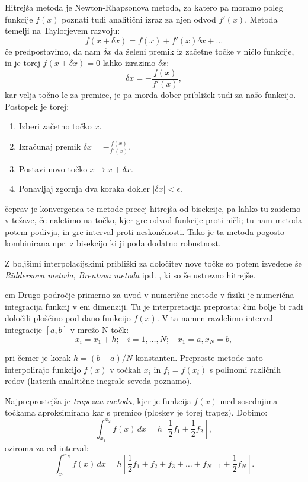 \documentclass[12pt]{article}
\begin{document}
Hitrejša metoda je Newton-Rhapsonova metoda, za katero pa moramo
poleg funkcije $f(x)$ poznati tudi analitični izraz za njen odvod
$f'(x)$.
Metoda temelji na Taylorjevem razvoju:
$$f(x+\delta x) = f(x)+f'(x) \delta x + \ldots$$
če predpostavimo, da nam $\delta x$ da želeni premik iz začetne
 točke v ničlo funkcije, in je torej $f(x+\delta x) = 0$
lahko izrazimo $\delta x$:
$$ \delta x = - \frac{f(x)}{f'(x)},$$
kar velja točno le za premice, je pa morda dober približek tudi
za našo funkcijo. Postopek je torej:
\begin{enumerate}
\item Izberi začetno točko $x$.
\item Izračunaj  premik $ \delta x = - \frac{f(x)}{f'(x)}.$
\item Postavi novo točko $x \to x+\delta x$.
\item Ponavljaj zgornja dva koraka dokler $|\delta x |< \epsilon$.
\end{enumerate}

čeprav je konvergenca te metode precej hitrejša od bisekcije, pa
lahko tu zaidemo v težave, če naletimo na točko, kjer gre
odvod funkcije proti ničli; tu nam metoda potem podivja, in gre
interval proti neskončnosti.  Tako je ta metoda pogosto kombinirana
npr. z bisekcijo ki ji poda dodatno robustnost.

Z boljšimi interpolacijskimi približki za določitev nove točke so potem izvedene še
\emph {Riddersova metoda}, \emph{Brentova metoda} ipd. , ki so še ustrezno
hitrejše.

 cm
Drugo področje primerno za uvod v numerične metode v fiziki je
numerična integracija funkcij v eni dimenziji. Tu je interpretacija
preprosta: čim bolje bi radi določili ploščino pod dano
funkcijo $f(x)$.  V ta namen razdelimo interval  integracije $[a,b]$ v
mrežo N točk:
$$x_i = x_1+ h;  ~~~~ i=1,\ldots,N ; ~~~~ x_1 =a , x_{N} = b, $$

pri čemer je korak $h=(b-a)/N$ konstanten. Preproste metode nato
interpolirajo funkcijo $f(x)$ v točkah $x_i$ in $f_i = f(x_i)$ s
polinomi različnih redov (katerih analitične inegrale seveda
poznamo).

Najpreprostejša je \emph{trapezna metoda}, kjer je funkcija $f(x)$
med sosednjima točkama aproksimirana kar s premico (ploskev je
torej trapez). Dobimo:
$$ \int_{x_1}^{x_2} f(x)\, dx = h \left [ \frac{1}{2} f_1 +  \frac{1}{2} f_2 \right ], $$
oziroma za cel interval:
$$ \int_{x_1}^{x_N} f(x)\, dx = h \left [ \frac{1}{2} f_1 + f_2 + f_3
  + \ldots + f_{N-1} + \frac{1}{2} f_N \right ].$$
\end{document}
